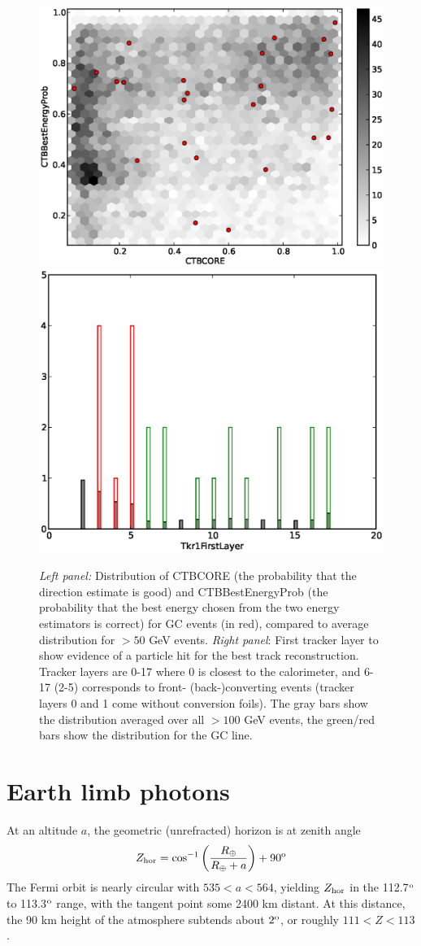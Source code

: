 \documentclass[aps,twocolumn,prd,superscriptaddress,showpacs,nofootinbib,fixfloat]{revtex4}
\newcommand{\be}{\begin{equation}}
\newcommand{\ee}{\end{equation}}
\newcommand{\degree}{^{\rm o}}
\begin{document}
\begin{figure}
  \centering
  \includegraphics[width=0.48\linewidth]{plots/CTBCORE_CTBBestEnergyProb.eps}
  \includegraphics[width=0.48\linewidth]{plots/Tkr1FirstLayer.eps}
  \caption{\emph{Left panel:} Distribution of CTBCORE (the probability that
  the direction estimate is good) and CTBBestEnergyProb (the probability that
  the best energy chosen from the two energy estimators is correct) for GC
  events (in red), compared to average distribution for $>50$ GeV events.
  \emph{Right panel}: First tracker layer to show evidence of a particle hit
  for the best track reconstruction. Tracker layers are 0-17 where 0 is
  closest to the calorimeter, and 6-17 (2-5) corresponds to front-
  (back-)converting events (tracker layers 0 and 1 come without conversion
  foils). The gray bars show the distribution averaged over all $>100$ GeV
  events, the green/red bars show the distribution for the GC line.}
  \label{fig:CTBquality}
\end{figure}

\clearpage
\section{Earth limb photons}
At an altitude $a$, the geometric (unrefracted) horizon is at zenith angle
\be
Z_{\rm hor} = \cos^{-1}\left(\frac{R_\oplus}{R_\oplus+a}\right)+90\degree
\ee
The Fermi orbit is nearly circular with $535 < a < 564$, yielding $Z_{\rm
  hor}$ in the 112.7$\degree$ to 113.3$\degree$ range, with the tangent point
some 2400 km distant.  At this distance, the 90 km height of the atmosphere
subtends about $2\degree$, or roughly $111 < Z < 113$.  
\end{document}
